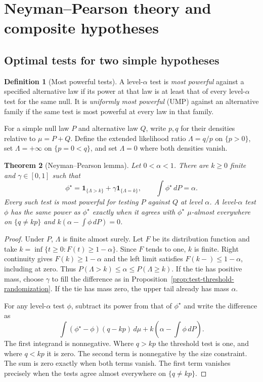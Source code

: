 \documentclass[11pt,oneside]{book}
\newtheorem{theorem}{Theorem}[chapter]
\theoremstyle{definition}
\newtheorem{definition}[theorem]{Definition}
\theoremstyle{remark}
\begin{document}
\clearpage
\section{Neyman--Pearson theory and composite hypotheses}
\label{sec:neyman-pearson-composite}

\subsection{Optimal tests for two simple hypotheses}
\label{subsec:neyman-pearson-lemma}

\begin{definition}[Most powerful tests]
\label{def:most-powerful-test}
A level-$\alpha$ test is \emph{most powerful} against a specified
alternative law if its power at that law is at least that of
every level-$\alpha$ test for the same null. It is \emph{uniformly
most powerful} (UMP) against an alternative family if the
same test is most powerful at every law in that family.
\end{definition}

For a simple null law $P$ and alternative law $Q$, write $p,q$
for their densities relative to $\mu=P+Q$. Define the extended
likelihood ratio $\Lambda=q/p$ on $\{p>0\}$, set $\Lambda=+\infty$
on $\{p=0<q\}$, and set $\Lambda=0$ where both densities vanish.

\begin{theorem}[Neyman--Pearson lemma]
\label{thm:neyman-pearson}
Let $0<\alpha<1$. There are $k\geq0$ finite and $\gamma\in[0,1]$
such that
\[
\phi^\star=\mathbf 1_{\{\Lambda>k\}}+
\gamma\mathbf 1_{\{\Lambda=k\}},
\qquad \int\phi^\star\,dP=\alpha .
\]
Every such test is most powerful for testing $P$ against $Q$
at level $\alpha$. A level-$\alpha$ test $\phi$ has the same
power as $\phi^\star$ exactly when it agrees with $\phi^\star$
$\mu$-almost everywhere on $\{q\ne kp\}$ and
$k(\alpha-\int\phi\,dP)=0$.
\end{theorem}
\begin{proof}
Under $P$, $\Lambda$ is finite almost surely. Let $F$ be its
distribution function and take
$k=\inf\{t\geq0:F(t)\geq1-\alpha\}$. Since $F$ tends to one,
$k$ is finite. Right continuity gives $F(k)\geq1-\alpha$ and
the left limit satisfies $F(k-)\leq1-\alpha$, including at zero.
Thus $P(\Lambda>k)\leq\alpha\leq P(\Lambda\geq k)$. If the tie
has positive mass, choose $\gamma$ to fill the difference as in
Proposition~\ref{prop:test-threshold-randomization}. If the
tie has mass zero, the upper tail already has mass $\alpha$.

For any level-$\alpha$ test $\phi$, subtract its power from
that of $\phi^\star$ and write the difference as
\[
\int(\phi^\star-\phi)(q-kp)\,d\mu
+k\left(\alpha-\int\phi\,dP\right).
\]
The first integrand is nonnegative. Where $q>kp$ the threshold
test is one, and where $q<kp$ it is zero. The second term is
nonnegative by the size constraint. The sum is zero exactly
when both terms vanish. The first term vanishes precisely
when the tests agree almost everywhere on $\{q\ne kp\}$.
\end{proof}
\end{document}
